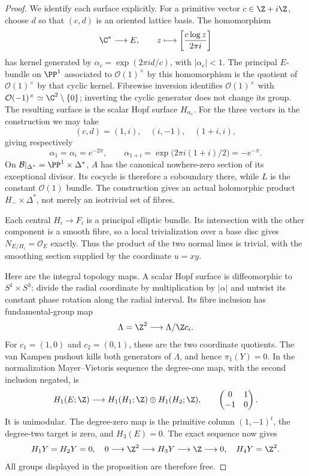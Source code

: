 \begin{proof}
We identify each surface explicitly.  For a primitive vector
$c\in\Z+i\Z$, choose $d$ so that $(c,d)$ is an oriented
lattice basis.  The homomorphism
\[
 \C^*\longrightarrow E,\qquad
 z\longmapsto\left[\frac{c\log z}{2\pi i}\right]
\]
has kernel generated by
$\alpha_c=\exp(2\pi i d/c)$, with $|\alpha_c|<1$.
The principal $E$-bundle on $\PP^1$ associated to
$\mathcal O(1)^\times$ by this homomorphism is the quotient
of $\mathcal O(1)^\times$ by that cyclic kernel.  Fibrewise
inversion identifies $\mathcal O(1)^\times$ with
$\mathcal O(-1)^\times\simeq\C^2\setminus\{0\}$;
inverting the cyclic generator does not change its group.
The resulting surface is the scalar Hopf surface $H_{\alpha_c}$.
For the three vectors in the construction we may take
\[
 (c,d)=(1,i),\quad(i,-1),\quad(1+i,i),
\]
giving respectively
\[
 \alpha_1=\alpha_i=e^{-2\pi},\qquad
 \alpha_{1+i}=\exp\bigl(2\pi i(1+i)/2\bigr)=-e^{-\pi}.
\]
On $\mathcal B|_{\Delta^*}=\PP^1\times\Delta^*$,
$A$ has the canonical nowhere-zero section of its exceptional
divisor.  Its cocycle is therefore a coboundary there, while
$L$ is the constant $\mathcal O(1)$ bundle.  The construction
gives an actual holomorphic product $H_-\times\Delta^*$,
not merely an isotrivial set of fibres.

Each central $H_i\to F_i$ is a principal elliptic bundle.
Its intersection with the other component is a smooth fibre,
so a local trivialization over a base disc gives
$N_{E/H_i}=\mathcal O_E$ exactly.  Thus the product of the
two normal lines is trivial, with the smoothing section supplied
by the coordinate $u=xy$.

Here are the integral topology maps.  A scalar Hopf surface is
diffeomorphic to $S^1\times S^3$: divide the radial coordinate
by multiplication by $|\alpha|$ and untwist its constant phase
rotation along the radial interval.  Its fibre inclusion has
fundamental-group map
\[
 \Lambda=\Z^2\longrightarrow\Lambda/\Z c_i.
\]
For $c_1=(1,0)$ and $c_2=(0,1)$, these are the two coordinate
quotients.  The van Kampen pushout kills both generators of
$\Lambda$, and hence $\pi_1(Y)=0$.  In the normalization
Mayer--Vietoris sequence the degree-one map, with the second
inclusion negated, is
\[
 H_1(E;\Z)\longrightarrow H_1(H_1;\Z)\oplus H_1(H_2;\Z),
 \qquad \begin{pmatrix}0&1\\-1&0\end{pmatrix}.
\]
It is unimodular.  The degree-zero map is the primitive column
$(1,-1)^t$, the degree-two target is zero, and $H_3(E)=0$.
The exact sequence now gives
\[
 H_1Y=H_2Y=0,\quad
 0\longrightarrow\Z^2\longrightarrow H_3Y
       \longrightarrow\Z\longrightarrow0,
 \quad H_4Y=\Z^2.
\]
All groups displayed in the proposition are therefore free.


\end{proof}
